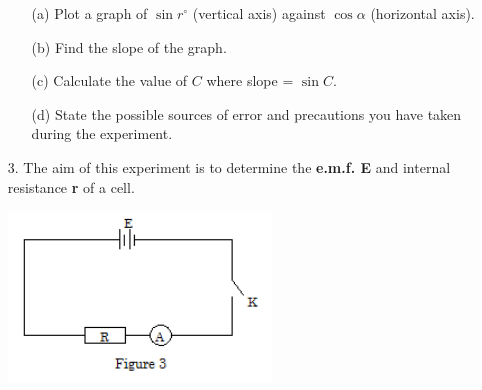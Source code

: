 \begin{enumerate}
\begin{enumerate}
\item[(a)] Plot a graph of $\sin{r^\circ}$ (vertical axis) against $\cos{\alpha}$ (horizontal axis).
\item[(b)] Find the slope of the graph.
\item[(c)] Calculate the value of $C$ where slope = $\sin{C}$.
\item[(d)] State the possible sources of error and precautions you have taken during the experiment.
\end{enumerate}

\item[3.] The aim of this experiment is to determine the \textbf{e.m.f. E} and internal resistance \textbf{r} of a cell.

\begin{center}
\includegraphics[width=7cm]{./img/2005-3-alt.png}
\end{center}


\end{enumerate}
